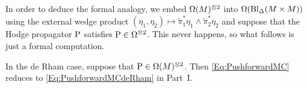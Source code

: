 \documentclass[\MainFolder/Text.tex]{subfiles}
\begin{document}
In order to deduce the formal analogy, we embed $\Omega(M)^{\otimes 2}$ into $\Omega(\mathrm{Bl}_{\Delta}(M\times M))$ using the external wedge product $(\eta_1,\eta_2)\mapsto \tilde{\pi}_1^*\eta_1 \wedge \tilde{\pi}_2^*\eta_2$ and suppose that the Hodge propagator $\mathrm{P}$ satisfies $\mathrm{P} \in \Omega^{\otimes 2}$. This never happens, so what follows is just a formal computation.%

\begin{Proposition}\label{Prop:FinDimAnalog}
In the de Rham case, suppose that $\mathrm{P}\in \Omega(M)^{\otimes 2}$. Then \eqref{Eq:PushforwardMC} reduces to \eqref{Eq:PushforwardMCdeRham} in Part~I.
\end{Proposition}
\end{document}
